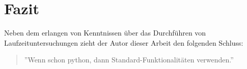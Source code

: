 \documentclass[
10pt, %
a4paper, %
oneside, %
headinclude,footinclude, %
BCOR5mm, %
]{scrartcl}
\begin{document}
\section{Fazit}

Neben dem erlangen von Kenntnissen über das Durchführen von Laufzeituntersuchungen zieht der Autor dieser Arbeit den folgenden Schluss:

\begin{quotation}
	''Wenn schon python, dann Standard-Funktionalitäten verwenden.''
\end{quotation}

\pagebreak


\renewcommand{\refname}{\spacedlowsmallcaps{Literatur/Quellen}} %




\end{document}
